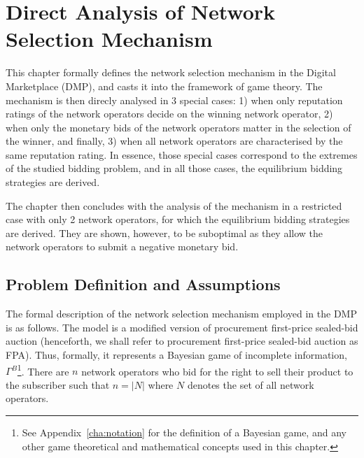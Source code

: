 \chapter{Direct Analysis of Network Selection Mechanism} %
\label{cha:direct}

\minitoc
\vspace{10mm}

This chapter formally defines the network selection mechanism in the Digital Marketplace (DMP), and casts it into the framework of game theory. The mechanism is then direcly analysed in 3 special cases: 1) when only reputation ratings of the network operators decide on the winning network operator, 2) when only the monetary bids of the network operators matter in the selection of the winner, and finally, 3) when all network operators are characterised by the same reputation rating. In essence, those special cases correspond to the extremes of the studied bidding problem, and in all those cases, the equilibrium bidding strategies are derived.

The chapter then concludes with the analysis of the mechanism in a restricted case with only 2 network operators, for which the equilibrium bidding strategies are derived. They are shown, however, to be suboptimal as they allow the network operators to submit a negative monetary bid.

\section{Problem Definition and Assumptions} %
\label{sec:problem_definition_and_assumptions_direct}
The formal description of the network selection mechanism employed in the DMP is as follows. The model is a modified version of procurement first-price sealed-bid auction (henceforth, we shall refer to procurement first-price sealed-bid auction as FPA). Thus, formally, it represents a Bayesian game of incomplete information, $\Gamma^B$\footnote{See Appendix~\ref{cha:notation} for the definition of a Bayesian game, and any other game theoretical and mathematical concepts used in this chapter.}. There are $n$ network operators who bid for the right to sell their product to the subscriber such that $n = |N|$ where $N$ denotes the set of all network operators.

